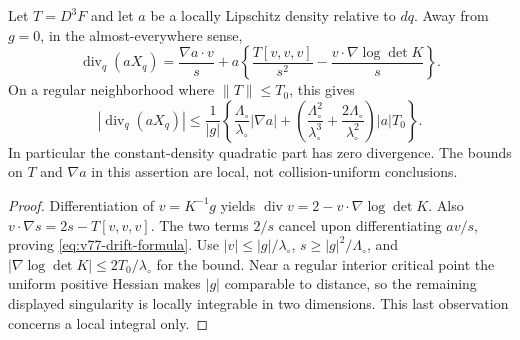 \begin{proposition}
\label{prop:v77-drift}
Let $T=D^3F$ and let $a$ be a locally Lipschitz density relative to
$dq$. Away from $g=0$, in the almost-everywhere sense,
\begin{equation}\label{eq:v77-drift-formula}
 \operatorname{div}_q(aX_q)
 =\frac{\nabla a\cdot v}{s}
   +a\left\{\frac{T[v,v,v]}{s^2}
              -\frac{v\cdot\nabla\log\det K}{s}\right\}.
\end{equation}
On a regular neighborhood where $\|T\|\le T_0$, this gives
\begin{equation}\label{eq:v77-drift-local-bound}
 |\operatorname{div}_q(aX_q)|
 \le\frac1{|g|}\left\{
 \frac{\Lambda_\circ}{\lambda_\circ}|\nabla a|
 +\left(\frac{\Lambda_\circ^2}{\lambda_\circ^3}
       +\frac{2\Lambda_\circ}{\lambda_\circ^2}\right)|a|T_0\right\}.
\end{equation}
In particular the constant-density quadratic part has zero divergence.
The bounds on $T$ and $\nabla a$ in this assertion are local, not
collision-uniform conclusions.
\end{proposition}
\begin{proof}
Differentiation of $v=K^{-1}g$ yields
$\operatorname{div}v=2-v\cdot\nabla\log\det K$.
Also $v\cdot\nabla s=2s-T[v,v,v]$. The two terms $2/s$
cancel upon differentiating $a v/s$, proving
\eqref{eq:v77-drift-formula}. Use $|v|\le|g|/\lambda_\circ$,
$s\ge|g|^2/\Lambda_\circ$, and
$|\nabla\log\det K|\le2T_0/\lambda_\circ$ for the bound.
Near a regular interior critical point the uniform positive Hessian
makes $|g|$ comparable to distance, so the remaining displayed
singularity is locally integrable in two dimensions. This last
observation concerns a local integral only.
\end{proof}
